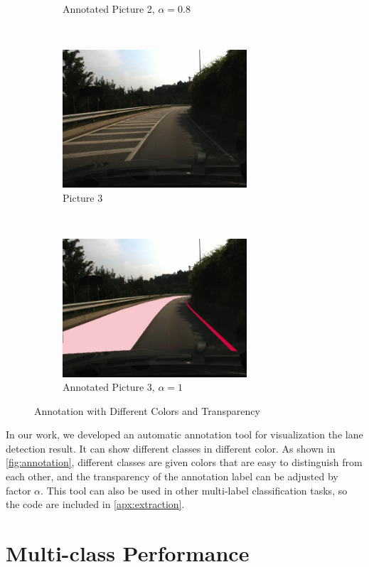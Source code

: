 \begin{spacing}{1.5}
\begin{figure}[!p]
\begin{subfigure}[b]{0.49\textwidth}
        \caption{Annotated Picture 2, $\alpha=0.8$}
    \end{subfigure}
    \\
    \begin{subfigure}[b]{0.49\textwidth}
        \centering
        \includegraphics[width=2.7in, fbox]{Chapter5/Picture3.jpg}
        \caption{Picture 3}
    \end{subfigure}%
    ~
    \begin{subfigure}[b]{0.49\textwidth}
        \centering
        \includegraphics[width=2.7in, fbox]{Chapter5/Picture3an.jpg}
        \caption{Annotated Picture 3, $\alpha=1$}
    \end{subfigure}
    \caption{Annotation with Different Colors and Transparency}
    \label{fig:annotation}
\end{figure}


In our work, we developed an automatic annotation tool for visualization the lane detection result. It can show different classes in different color. As shown in \autoref{fig:annotation}, different classes are given colors that are easy to distinguish from each other, and the transparency of the annotation label can be adjusted by factor $\alpha$. This tool can also be used in other multi-label classification tasks, so the code are included in \autoref{apx:extraction}.

\section{Multi-class Performance}



\end{spacing}
